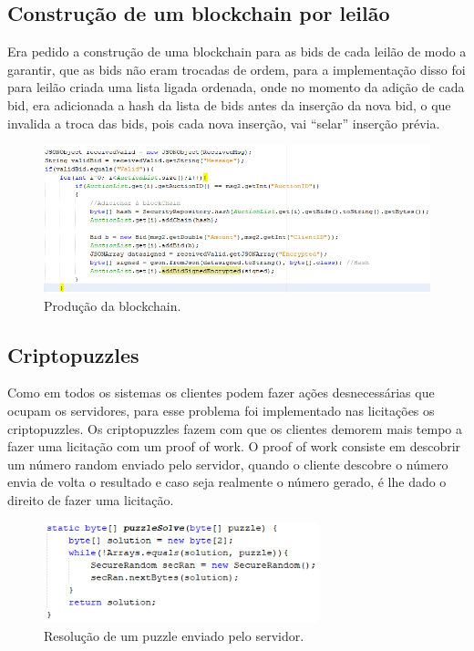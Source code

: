 \documentclass[pdftex,12pt,a4paper]{report}
\begin{document}
\subsection{Construção de um blockchain por leilão}
Era pedido a construção de uma blockchain para as bids de cada leilão de modo a garantir, que as bids não eram trocadas de ordem, para a implementação disso foi para leilão criada uma lista ligada ordenada, onde no momento da adição de cada bid, era adicionada a hash da lista de bids antes da inserção da nova bid, o que invalida a troca das bids, pois cada nova inserção, vai “selar” inserção prévia.
\begin{figure}[h]
    \centering
    \includegraphics[width=15.0cm]{blockchain.png}
    \caption{Produção da blockchain.}
    \label{fig:mesh1}
\end{figure}

\newpage
\subsection{Criptopuzzles}
Como em todos os sistemas os clientes podem fazer ações desnecessárias que ocupam os servidores, para esse problema foi implementado nas licitações os criptopuzzles. Os criptopuzzles fazem com que os clientes demorem mais tempo a fazer uma licitação com um proof of work. O proof of work consiste em descobrir um número random enviado pelo servidor, quando o cliente descobre o número envia de volta o resultado e caso seja realmente o número gerado, é lhe dado o direito de fazer uma licitação.
\begin{figure}[h]
    \centering
    \includegraphics[width=8.0cm]{puzzle.png}
    \caption{Resolução de um puzzle enviado pelo servidor.}
    \label{fig:mesh1}
\end{figure}
\end{document}
